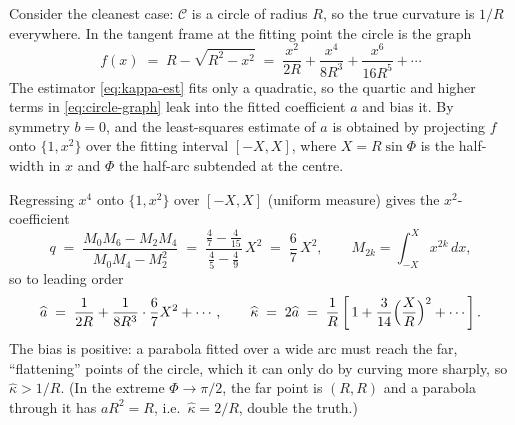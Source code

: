 \documentclass[11pt]{article}
\begin{document}
Consider the cleanest case: $\mathcal{C}$ is a circle of radius $R$, so the true
curvature is $1/R$ everywhere. In the tangent frame at the fitting point the
circle is the graph
\begin{equation}
  f(x) \;=\; R-\sqrt{R^2-x^2}
        \;=\; \frac{x^2}{2R} + \frac{x^4}{8R^3} + \frac{x^6}{16R^5} + \cdots
  \label{eq:circle-graph}
\end{equation}
The estimator \eqref{eq:kappa-est} fits only a quadratic, so the quartic and
higher terms in \eqref{eq:circle-graph} leak into the fitted coefficient $a$ and
bias it. By symmetry $b=0$, and the least-squares estimate of $a$ is obtained by
projecting $f$ onto $\{1,x^2\}$ over the fitting interval $[-X,X]$, where
$X = R\sin\Phi$ is the half-width in $x$ and $\Phi$ the half-arc subtended at the
centre.

Regressing $x^4$ onto $\{1,x^2\}$ over $[-X,X]$ (uniform measure) gives the
$x^2$-coefficient
\begin{equation}
  q \;=\; \frac{M_0 M_6 - M_2 M_4}{M_0 M_4 - M_2^2}
    \;=\; \frac{\tfrac{4}{7}-\tfrac{4}{15}}{\tfrac{4}{5}-\tfrac{4}{9}}\,X^2
    \;=\; \frac{6}{7}\,X^2,
  \qquad M_{2k}=\int_{-X}^{X}\! x^{2k}\,dx,
\end{equation}
so to leading order
\begin{equation}
  \widehat{a} \;=\; \frac{1}{2R} + \frac{1}{8R^3}\cdot\frac{6}{7}X^2 + \cdots,
  \qquad
  \widehat{\kappa} \;=\; 2\widehat{a}
  \;=\; \frac{1}{R}\left[\,1 + \frac{3}{14}\Bigl(\frac{X}{R}\Bigr)^2 + \cdots\right].
  \label{eq:bias-1}
\end{equation}
The bias is positive: a parabola fitted over a wide arc must reach the far,
``flattening'' points of the circle, which it can only do by curving more
sharply, so $\widehat{\kappa}>1/R$. (In the extreme $\Phi\to\pi/2$, the far point
is $(R,R)$ and a parabola through it has $aR^2=R$, i.e.\ $\widehat\kappa = 2/R$,
double the truth.)
\end{document}
